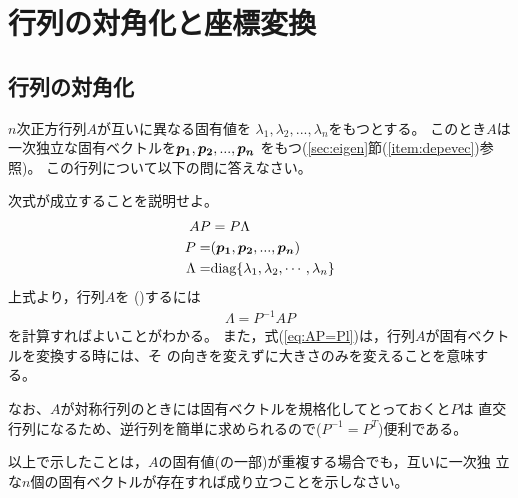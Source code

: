 \documentclass[twocolumn,11pt]{jarticle}
\begin{document}

\section{行列の対角化と座標変換}

\subsection{行列の対角化\label{sec:diagonalization}}

$n$次正方行列$A$が互いに異なる固有値を
$\lambda_1,\lambda_2,...,\lambda_n$をもつとする。
このとき$A$は一次独立な固有ベクトルを$\boldsymbol{p_1},\boldsymbol{p_2},...,\boldsymbol{p_n}$
をもつ(\ref{sec:eigen}節(\ref{item:depevec})参照)。
この行列について以下の問に答えなさい。

\nquestion
次式が成立することを説明せよ。 
  \begin{align}
    AP&=P\Lambda\label{eq:AP=Pl}\\
    P=&(\boldsymbol{p_1},\boldsymbol{p_2},...,\boldsymbol{p_n})\notag\\
    \Lambda=&\mbox{diag}\{\lambda_1,\lambda_2,\cdots,\lambda_n\}\notag
  \end{align}
\comment
上式より，行列$A$を
()するには
\begin{align}
  \label{eq:diagonalization}
  \Lambda=P^{-1}AP
\end{align}
を計算すればよいことがわかる。
また，式(\ref{eq:AP=Pl})は，行列$A$が固有ベクトルを変換する時には、そ
の向きを変えずに大きさのみを変えることを意味する。

なお、$A$が対称行列のときには固有ベクトルを規格化してとっておくと$P$は
直交行列になるため、逆行列を簡単に求められるので($P^{-1}=P^T$)便利である。

\nquestion
以上で示したことは，$A$の固有値(の一部)が重複する場合でも，互いに一次独
立な$n$個の固有ベクトルが存在すれば成り立つことを示しなさい。
\end{document}
